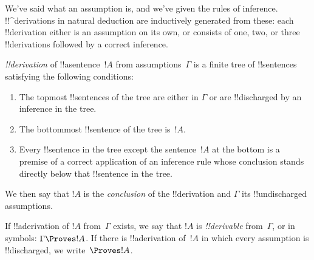 \documentclass[../../../include/open-logic-section]{subfiles}
\begin{document}
      {}
      {}

\begin{explain}
We've said what an assumption is, and we've given the rules of
inference.  !!^{derivation}s in natural deduction are inductively
generated from these: each !!{derivation} either is an assumption
on its own, or consists of one, two, or three !!{derivation}s followed
by a correct inference.
\end{explain}

\begin{defn}[!!^{derivation}]
 \emph{!!{derivation}} of !!a{sentence}~$!A$ from
assumptions~$\Gamma$ is a finite tree of !!{sentence}s satisfying the
following conditions:
\begin{enumerate}
\item The topmost !!{sentence}s of the tree are either in $\Gamma$ or
  are !!{discharged} by an inference in the tree.
\item The bottommost !!{sentence} of the tree is~$!A$.
\item Every !!{sentence} in the tree except the sentence~$!A$ at
  the bottom is a premise of a correct application of an inference
  rule whose conclusion stands directly below that !!{sentence} in the
  tree.
\end{enumerate}
We then say that $!A$ is the \emph{conclusion} of the !!{derivation}
and $\Gamma$ its !!{undischarged} assumptions.

If !!a{derivation} of $!A$ from~$\Gamma$ exists, we say that $!A$ is
\emph{!!{derivable}} from~$\Gamma$, or in symbols: $\Gamma \Proves
!A$. If there is !!a{derivation} of~$!A$ in which every assumption is
!!{discharged}, we write~$\Proves !A$.
\end{defn}
\end{document}
